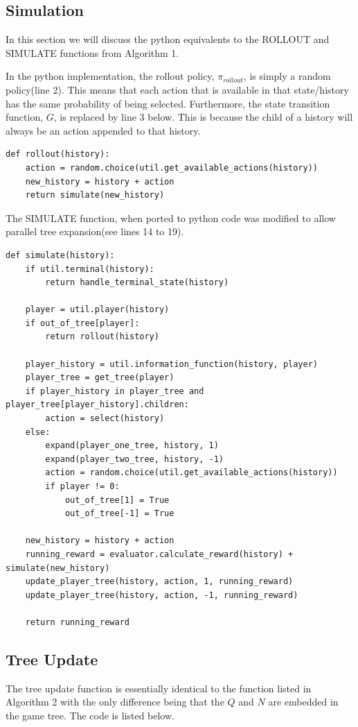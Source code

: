 \subsection{Simulation}\label{subsec:simulation}
In this section we will discuss the python equivalents to the ROLLOUT and SIMULATE functions from Algorithm 1.

In the python implementation, the rollout policy, $\pi_{rollout}$, is simply a random policy(line 2).
This means that each action that is available in that state/history has the same probability of being selected.
Furthermore, the state transition function, $G$, is replaced by line 3 below.
This is because the child of a history will always be an action appended to that history.

\begin{lstlisting}[style=Python]
def rollout(history):
    action = random.choice(util.get_available_actions(history))
    new_history = history + action
    return simulate(new_history)
\end{lstlisting}

The SIMULATE function, when ported to python code was modified to allow parallel tree expansion(see lines 14 to 19).
\begin{lstlisting}[style=Python]
def simulate(history):
    if util.terminal(history):
        return handle_terminal_state(history)

    player = util.player(history)
    if out_of_tree[player]:
        return rollout(history)

    player_history = util.information_function(history, player)
    player_tree = get_tree(player)
    if player_history in player_tree and player_tree[player_history].children:
        action = select(history)
    else:
        expand(player_one_tree, history, 1)
        expand(player_two_tree, history, -1)
        action = random.choice(util.get_available_actions(history))
        if player != 0:
            out_of_tree[1] = True
            out_of_tree[-1] = True

    new_history = history + action
    running_reward = evaluator.calculate_reward(history) + simulate(new_history)
    update_player_tree(history, action, 1, running_reward)
    update_player_tree(history, action, -1, running_reward)

    return running_reward
\end{lstlisting}


\subsection{Tree Update}\label{subsec:treeUpdate}
The tree update function is essentially identical to the function listed in Algorithm 2 with
the only difference being that the $Q$ and $N$ are embedded in the game tree.
The code is listed below.

